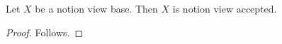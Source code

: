 

\begin{proposition}\label{notion_view_use}
    Let $X$ be a notion view base.
    Then $X$ is notion view accepted.
\end{proposition}
\begin{proof}
    Follows.
\end{proof}
